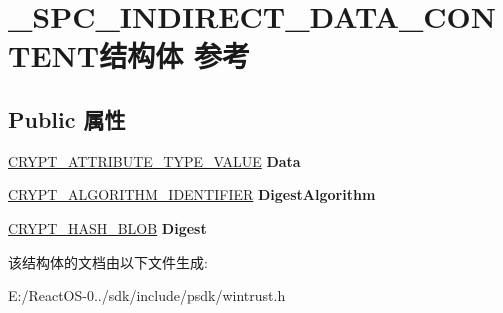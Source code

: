 \hypertarget{struct___s_p_c___i_n_d_i_r_e_c_t___d_a_t_a___c_o_n_t_e_n_t}{}\section{\+\_\+\+S\+P\+C\+\_\+\+I\+N\+D\+I\+R\+E\+C\+T\+\_\+\+D\+A\+T\+A\+\_\+\+C\+O\+N\+T\+E\+N\+T结构体 参考}
\label{struct___s_p_c___i_n_d_i_r_e_c_t___d_a_t_a___c_o_n_t_e_n_t}
\subsection*{Public 属性}
\begin{DoxyCompactItemize}
\item 
\mbox{\label{struct___s_p_c___i_n_d_i_r_e_c_t___d_a_t_a___c_o_n_t_e_n_t_ab3a42e338925ead7c58981a8750017cb}} 
\hyperlink{struct___c_r_y_p_t___a_t_t_r_i_b_u_t_e___t_y_p_e___v_a_l_u_e}{C\+R\+Y\+P\+T\+\_\+\+A\+T\+T\+R\+I\+B\+U\+T\+E\+\_\+\+T\+Y\+P\+E\+\_\+\+V\+A\+L\+UE} {\bfseries Data}
\item 
\mbox{\label{struct___s_p_c___i_n_d_i_r_e_c_t___d_a_t_a___c_o_n_t_e_n_t_a00688ad4469eb4c5b15d013b2508850e}} 
\hyperlink{struct___c_r_y_p_t___a_l_g_o_r_i_t_h_m___i_d_e_n_t_i_f_i_e_r}{C\+R\+Y\+P\+T\+\_\+\+A\+L\+G\+O\+R\+I\+T\+H\+M\+\_\+\+I\+D\+E\+N\+T\+I\+F\+I\+ER} {\bfseries Digest\+Algorithm}
\item 
\mbox{\label{struct___s_p_c___i_n_d_i_r_e_c_t___d_a_t_a___c_o_n_t_e_n_t_addfa99bd4a8ec76b7531c5a7d4780c1c}} 
\hyperlink{struct___c_r_y_p_t_o_a_p_i___b_l_o_b}{C\+R\+Y\+P\+T\+\_\+\+H\+A\+S\+H\+\_\+\+B\+L\+OB} {\bfseries Digest}
\end{DoxyCompactItemize}


该结构体的文档由以下文件生成\+:\begin{DoxyCompactItemize}
\item 
E\+:/\+React\+O\+S-\/0../sdk/include/psdk/wintrust.\+h\end{DoxyCompactItemize}
